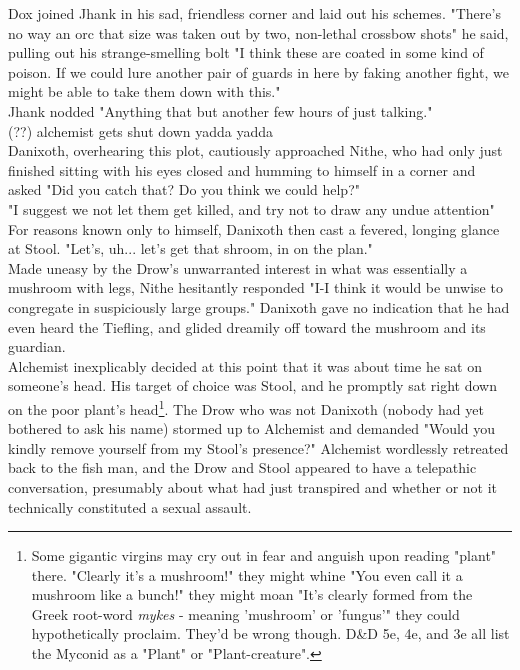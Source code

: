 \documentclass[letterpaper,10pt,twoside,twocolumn,openany]{book}
\begin{document}
Dox joined Jhank in his sad, friendless corner and laid out his schemes. "There's no way an orc that size was taken out by two, non-lethal crossbow shots" he said, pulling out his strange-smelling bolt "I think these are coated in some kind of poison. If we could lure another pair of guards in here by faking another fight, we might be able to take them down with this."\\
Jhank nodded "Anything that but another few hours of just talking."\\

(??) alchemist gets shut down yadda yadda\\

Danixoth, overhearing this plot, cautiously approached Nithe, who had only just finished sitting with his eyes closed and humming to himself in a corner and asked "Did you catch that? Do you think we could help?"\\
"I suggest we not let them get killed, and try not to draw any undue attention"\\
For reasons known only to himself, Danixoth then cast a fevered, longing glance at Stool. "Let's, uh... let's get that shroom, in on the plan."\\
Made uneasy by the Drow's unwarranted interest in what was essentially a mushroom with legs, Nithe hesitantly responded "I-I think it would be unwise to congregate in suspiciously large groups."
Danixoth gave no indication that he had even heard the Tiefling, and glided dreamily off toward the mushroom and its guardian.\\

Alchemist inexplicably decided at this point that it was about time he sat on someone's head. His target of choice was Stool, and he promptly sat right down on the poor plant's head\footnote{Some gigantic virgins may cry out in fear and anguish upon reading "plant" there. "Clearly it's a mushroom!" they might whine "You even call it a mushroom like a bunch!" they might moan "It's clearly formed from the Greek root-word \emph{mykes} - meaning 'mushroom' or 'fungus'" they could hypothetically proclaim. They'd be wrong though. D\&D 5e, 4e, and 3e all list the Myconid as a "Plant" or "Plant-creature".}. The Drow who was not Danixoth (nobody had yet bothered to ask his name) stormed up to Alchemist and demanded "Would you kindly remove yourself from my Stool's presence?" Alchemist wordlessly retreated back to the fish man, and the Drow and Stool appeared to have a telepathic conversation, presumably about what had just transpired and whether or not it technically constituted a sexual assault.\\
\end{document}
